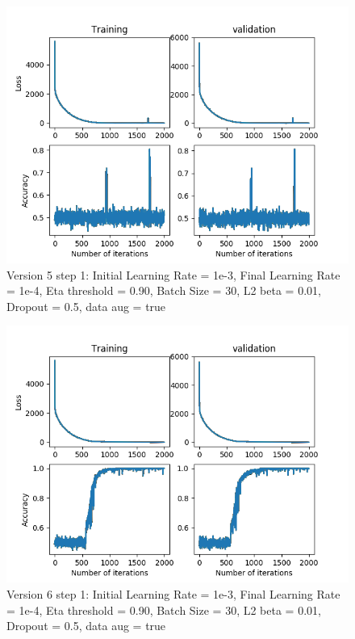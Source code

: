 \documentclass[12pt,reqno]{amsart}
\numberwithin{equation}{section}
\begin{document}
\begin{enumerate}
\begin{figure}[H]
\centering
\includegraphics[scale=0.6]{data_liquid10_version5_step1}
\caption{Version 5 step 1: Initial Learning Rate = 1e-3, Final Learning Rate = 1e-4, Eta threshold = 0.90, Batch Size = 30, L2 beta = 0.01, Dropout = 0.5, data aug = true}
\end{figure}

\begin{figure}[H]
\centering
\includegraphics[scale=0.6]{data_liquid10_version6_step1}
\caption{Version 6 step 1: Initial Learning Rate = 1e-3, Final Learning Rate = 1e-4, Eta threshold = 0.90, Batch Size = 30, L2 beta = 0.01, Dropout = 0.5, data aug = true}
\end{figure}


\end{enumerate}
\end{document}
